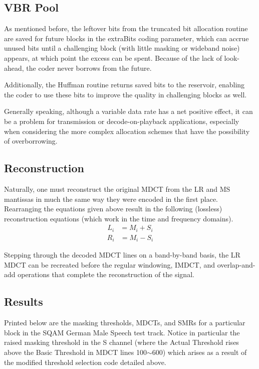 \documentclass{vldb}
\begin{document}
\subsection{VBR Pool}
As mentioned before, the leftover bits from the truncated bit allocation routine are saved for future blocks in the extraBits coding parameter, which can accrue unused bits until a challenging block (with little masking or wideband noise) appears, at which point the excess can be spent. Because of the lack of look-ahead, the coder never borrows from the future.

Additionally, the Huffman routine returns saved bits to the reservoir, enabling the coder to use these bits to improve the quality in challenging blocks as well.

Generally speaking, although a variable data rate has a net positive effect, it can be a problem for transmission or decode-on-playback applications, especially when considering the more complex allocation schemes that have the possibility of overborrowing.

\subsection{Reconstruction}
Naturally, one must reconstruct the original MDCT from the LR and MS mantissas in much the same way they were encoded in the first place. Rearranging the equations given above result in the following (lossless) reconstruction equations (which work in the time and frequency domains)\cite{Bosi2002}.
\begin{align*}
L_i &= M_i + S_i
\end{align*}
\begin{align*}
R_i &= M_i - S_i 
\end{align*}

Stepping through the decoded MDCT lines on a band-by-band basis, the LR MDCT can be recreated before the regular windowing, IMDCT, and overlap-and-add operations that complete the reconstruction of the signal.

\subsection{Results}
Printed below are the masking thresholds, MDCTs, and SMRs for a particular block in the SQAM German Male Speech test track. Notice in particular the raised masking threshold in the S channel (where the Actual Threshold rises above the Basic Threshold in MDCT lines 100$\sim$600) which arises as a result of the modified threshold selection code detailed above.
\end{document}
